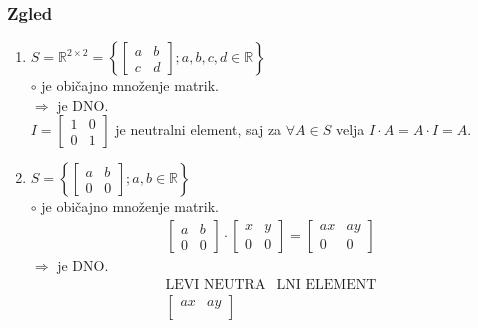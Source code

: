 \subsubsection{Zgled}
\begin{enumerate}[label=\alph*)]
    \item $S = \mathbb{R}^{2 \times 2} = 
    \left\{ 
        \begin{bmatrix}
            a & b \\
            c & d
        \end{bmatrix} 
    ;
    a, b, c, d \in \mathbb{R}
    \right\}$ \\[1em]
    $\circ$ je običajno množenje matrik. \\[1em]
    $\Rightarrow$ je DNO. \\[1em]
    $I = \begin{bmatrix}
        1 & 0 \\
        0 & 1
    \end{bmatrix}$ je neutralni element, saj za $\forall A \in S$ velja $I \cdot A = A \cdot I = A$. \\[1em]
    \item $S = \left\{
        \begin{bmatrix}
            a & b \\
            0 & 0
        \end{bmatrix};
        a, b \in \mathbb{R}
    \right\}$ \\ [1em]
    $\circ$ je običajno množenje matrik.
    \begin{align*}
        \begin{bmatrix}
            a & b \\
            0 & 0
        \end{bmatrix}
        \cdot
        \begin{bmatrix}
            x & y \\
            0 & 0
        \end{bmatrix}
        = 
        \begin{bmatrix}
            ax & ay \\
            0 & 0
        \end{bmatrix}
    \end{align*}
    $\Rightarrow$ je DNO.
    \begin{align*}
        \text{LEVI NEUTRA} & \text{LNI ELEMENT} \\[1em]
        \begin{bmatrix}
            ax & ay \\

\end{bmatrix}
\end{align*}
\end{enumerate}
